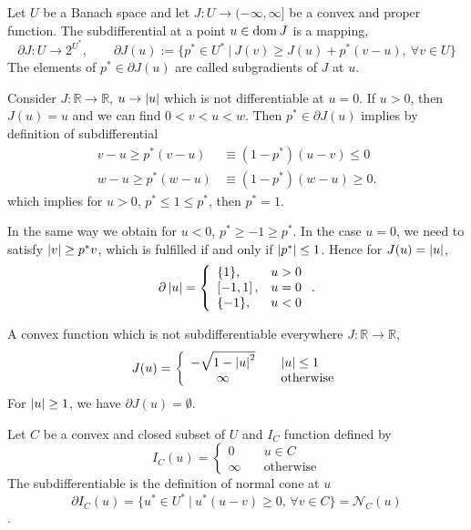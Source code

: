 \begin{definition}
	Let $U$ be a Banach space and let $J:U\rightarrow (-\infty, \infty]$ be a convex and proper function.
	The subdifferential at a point $u \in \mathrm{dom\,} J$ is a mapping,
	\[
		\partial J : U \rightarrow 2^{U^*}, \qquad \partial J(u):=\lbrace p^* \in U^* \ | \ J(v)\geq J(u)+p^*(v-u),
		\ \forall v \in U\rbrace
	\]
	The elements of $p^* \in \partial J(u)$ are called subgradients of $J$ at $u$.
\end{definition}
\begin{example}
	Consider $J:\mathbb{R}\rightarrow \mathbb{R}$, $u\rightarrow \left|u\right|$ which is not differentiable at $u=0$. If $u>0$, then $J(u)=u$ and we can find $0<v<u<w$. Then $p^* \in \partial J(u)$ implies by definition of subdifferential
	\begin{align*}
		v-u \geq p^*(v-u) &\equiv (1-p^*)(u-v) \leq 0 \\
		w-u \geq p^*(w-u) &\equiv (1-p^*)(w-u) \geq 0.
	\end{align*}
	which implies for $u>0$, $p^* \leq 1 \leq p^*$, then $p^*=1$.
	
	In the same way we obtain for $u<0$, $p^*\geq -1 \geq p^*$. 
	In the case $u=0$, we need to satisfy $\left|v\right|\geq p^*v$, which is fulfilled if and only if $\left|p^*\right|\leq 1$. Hence for $J(u)=\left|u\right|$,
	\begin{equation*}
	\partial \left|u\right|=
	\left\lbrace
		\begin{array}{lr}
		\{1\}, & u>0 \\
		\left[-1,1\right], & u=0 \\
		\{-1\}, & u < 0
		\end{array}
	\right. .
	\end{equation*}
\end{example}

\begin{example}
	A convex function which is not subdifferentiable everywhere $J:\mathbb{R} \rightarrow \mathbb{R}$, 
	\begin{equation*}
		J(u)=\left\lbrace\begin{array}{cl}
		 -\sqrt{1-\left|u\right|^2} &\quad \left|u\right|\leq 1 \\
		 \infty &\quad \text{otherwise}
		\end{array}
	\right.
	\end{equation*}
	For $\left|u\right|\geq 1$, we have $\partial J(u) = \emptyset$.
\end{example}

\begin{example}
	Let $C$ be a convex and closed subset of $U$ and $I_C$ function defined by
	\[
		I_C (u)=
		\left\lbrace
		\begin{array}{cl}
			0 \quad& u\in C \\
			\infty \quad& \text{otherwise}
		\end{array}
		\right.
	\]
	The subdifferentiable is the definition of normal cone at $u$
	\[\partial I_C (u)=\lbrace u^* \in U^* \ | \ u^*(u-v)\geq 0, \, \forall v \in C\rbrace = \mathcal{N}_C(u)\].

\end{example}


